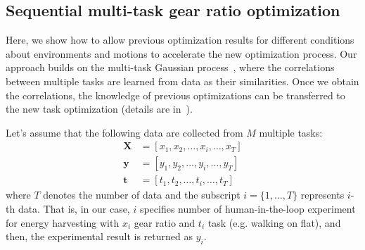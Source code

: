 \documentclass[twocolumn]{svjour3}          %
\begin{document}
\subsection{Sequential multi-task gear ratio optimization}
\label{subsec:BO_multi}

Here, we show how to allow previous optimization results for different conditions about environments and motions to accelerate the new optimization process.
Our approach builds on the multi-task Gaussian process~\cite{bonilla2008multi}, where the correlations between multiple tasks are learned from data as their similarities.
Once we obtain the correlations, the knowledge of previous optimizations can be transferred to the new task optimization (details are in~\cite{swersky2013multi}).

Let's assume that the following data are collected from $M$ multiple tasks:
\begin{align}
    \boldsymbol X &= [x_1, x_2, \ldots, x_i, \ldots, x_T]
    \label{eq:dataset_x}\\
    \boldsymbol y &= [y_1, y_2, \ldots, y_i, \ldots, y_T]
    \label{eq:dataset_y}\\
    \boldsymbol t &= [t_1, t_2, \ldots, t_i, \ldots, t_T]
    \label{eq:dataset_t}
\end{align}
where $T$ denotes the number of data and the subscript $i = \{1, \ldots, T\}$ represents $i$-th data.
That is, in our case, $i$ specifies number of human-in-the-loop experiment for energy harvesting with $x_i$ gear ratio and $t_i$ task (e.g. walking on flat), and then, the experimental result is returned as $y_i$.
\end{document}
